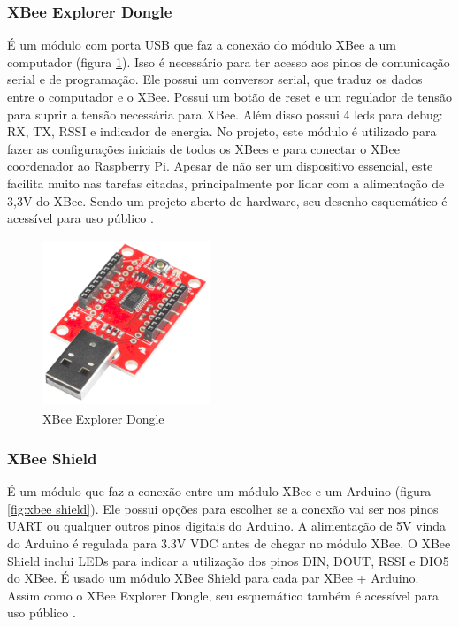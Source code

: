 \subsubsection{XBee Explorer Dongle}

É um módulo com porta USB que faz a conexão do módulo XBee a um computador (figura \ref{fig:xbee explorer dongle}). Isso é necessário para ter acesso aos pinos de comunicação serial e de programação. Ele possui um conversor serial, que traduz os dados entre o computador e o XBee. Possui um botão de reset e um regulador de tensão para suprir a tensão necessária para XBee. Além disso possui 4 leds para debug: RX, TX, RSSI e indicador de energia. No projeto, este módulo é utilizado para fazer as configurações iniciais de todos os XBees e para conectar o XBee coordenador ao Raspberry Pi. Apesar de não ser um dispositivo essencial, este facilita muito nas tarefas citadas,  principalmente por lidar com a alimentação de 3,3V do XBee. Sendo um projeto aberto de hardware, seu desenho esquemático é acessível para uso público \cite{xbee_explorer_dongle_schematic}. 

\begin{figure}[H]
\begin{center}
\includegraphics[width=5cm,height=5cm,keepaspectratio]{figuras/xbee_explorer_dongle.png}
\caption{\label{fig:xbee explorer dongle} XBee Explorer Dongle}
\end{center}
\end{figure}

\subsubsection{XBee Shield}

É um módulo que faz a conexão entre um módulo XBee e um Arduino (figura \ref{fig:xbee shield}). Ele possui opções para escolher se a conexão vai ser nos pinos UART ou qualquer outros pinos digitais do Arduino. A alimentação de 5V vinda do Arduino é regulada para 3.3V VDC antes de chegar no módulo XBee. O XBee Shield inclui LEDs para indicar a utilização dos pinos DIN, DOUT, RSSI e DIO5 do XBee. É usado um módulo XBee Shield para cada par XBee + Arduino. Assim como o XBee Explorer Dongle, seu esquemático também é acessível para uso público \cite{xbee_shield_schematic}. 

